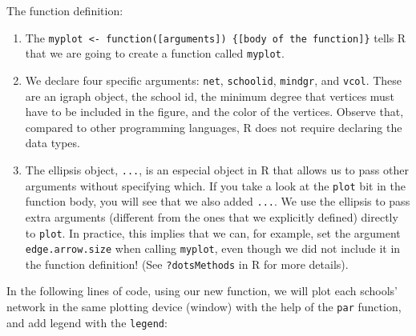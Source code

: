\documentclass[
]{book}
\begin{document}
The function definition:

\begin{enumerate}
\def\labelenumi{\arabic{enumi}.}
\item
  The \texttt{myplot\ \textless{}-\ function({[}arguments{]})\ \{{[}body\ of\ the\ function{]}\}} tells R that we are going to create a function called \texttt{myplot}.
\item
  We declare four specific arguments: \texttt{net}, \texttt{schoolid}, \texttt{mindgr}, and \texttt{vcol}. These are an igraph object, the school id, the minimum degree that vertices must have to be included in the figure, and the color of the vertices. Observe that, compared to other programming languages, R does not require declaring the data types.
\item
  The ellipsis object, \texttt{...}, is an especial object in R that allows us to pass other arguments without specifying which. If you take a look at the \texttt{plot} bit in the function body, you will see that we also added \texttt{...}. We use the ellipsis to pass extra arguments (different from the ones that we explicitly defined) directly to \texttt{plot}. In practice, this implies that we can, for example, set the argument \texttt{edge.arrow.size} when calling \texttt{myplot}, even though we did not include it in the function definition! (See \texttt{?dotsMethods} in R for more details).
\end{enumerate}

In the following lines of code, using our new function, we will plot each schools' network in the same plotting device (window) with the help of the \texttt{par} function, and add legend with the \texttt{legend}:
\end{document}
